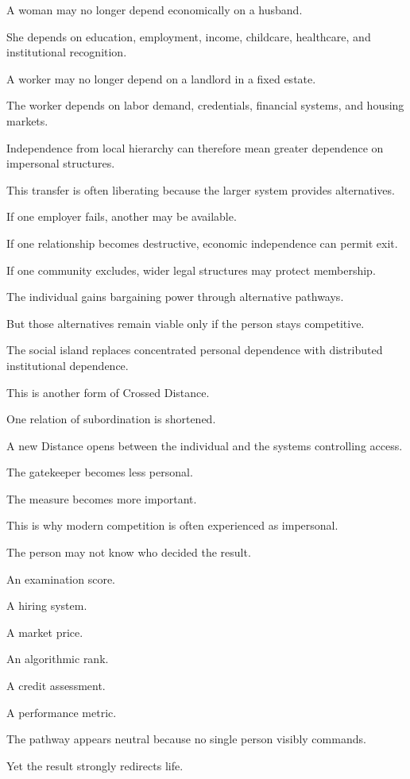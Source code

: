 A woman may no longer depend economically on a husband.

She depends on education, employment, income, childcare, healthcare, and institutional recognition.

A worker may no longer depend on a landlord in a fixed estate.

The worker depends on labor demand, credentials, financial systems, and housing markets.

Independence from local hierarchy can therefore mean greater dependence on impersonal structures.

This transfer is often liberating because the larger system provides alternatives.

If one employer fails, another may be available.

If one relationship becomes destructive, economic independence can permit exit.

If one community excludes, wider legal structures may protect membership.

The individual gains bargaining power through alternative pathways.

But those alternatives remain viable only if the person stays competitive.

The social island replaces concentrated personal dependence with distributed institutional dependence.

This is another form of Crossed Distance.

One relation of subordination is shortened.

A new Distance opens between the individual and the systems controlling access.

The gatekeeper becomes less personal.

The measure becomes more important.

This is why modern competition is often experienced as impersonal.

The person may not know who decided the result.

An examination score.

A hiring system.

A market price.

An algorithmic rank.

A credit assessment.

A performance metric.

The pathway appears neutral because no single person visibly commands.

Yet the result strongly redirects life.

